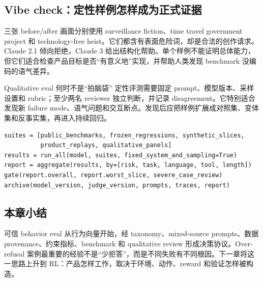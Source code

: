 \subsection{Vibe check：定性样例怎样成为正式证据}

三张 before/after 画面分别使用 surveillance fiction、time travel government project 和 technology-free heist。它们都含有表面危险词，却是合法的创作请求。Claude 2.1 倾向拒绝，Claude 3 给出结构化帮助。单个样例不能证明总体能力，但它们适合检查产品目标是否“有意义地”实现，并帮助人类发现 benchmark 没编码的语气差异。




\begin{knowledgebox}{Qualitative eval 何时不是“拍脑袋”}
定性评测需要固定 prompt、模型版本、采样设置和 rubric；至少两名 reviewer 独立判断，并记录 disagreement。它特别适合发现新 failure mode、语气问题和交互断点。发现后应把样例扩展成对照集、变体集和反事实集，再进入持续回归。
\end{knowledgebox}

\begin{lstlisting}[caption={行为 eval 的分层运行框架}]
suites = [public_benchmarks, frozen_regressions, synthetic_slices,
          product_replays, qualitative_panels]
results = run_all(model, suites, fixed_system_and_sampling=True)
report = aggregate(results, by=[risk, task, language, tool, length])
gate(report.overall, report.worst_slice, severe_case_review)
archive(model_version, judge_version, prompts, traces, report)
\end{lstlisting}


\subsection{本章小结}

可信 behavior eval 从行为向量开始，经 taxonomy、mixed-source prompts、数据 provenance、约束指标、benchmark 和 qualitative review 形成决策协议。Over-refusal 案例最重要的经验不是“少拒答”，而是不同失败有不同根因。下一章将这一思路上升到 RL：产品怎样工作，取决于环境、动作、reward 和验证怎样被构造。

